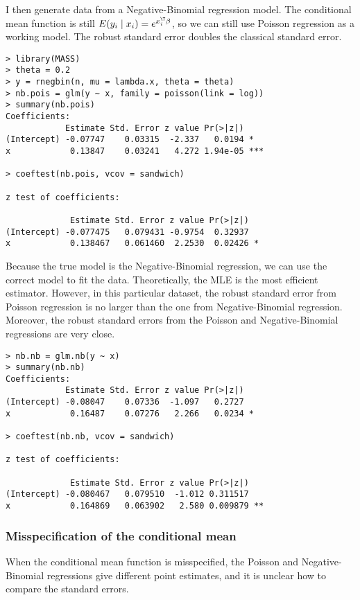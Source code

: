 I then generate data from a Negative-Binomial regression model. The conditional mean function is still $E(y_i\mid x_i) = e^{x_i^{\T} \beta}$, so we can still use Poisson regression as a working model. The robust standard error doubles the classical standard error. 

\begin{lstlisting}
> library(MASS)
> theta = 0.2
> y = rnegbin(n, mu = lambda.x, theta = theta)
> nb.pois = glm(y ~ x, family = poisson(link = log))
> summary(nb.pois)
Coefficients:
            Estimate Std. Error z value Pr(>|z|)    
(Intercept) -0.07747    0.03315  -2.337   0.0194 *  
x            0.13847    0.03241   4.272 1.94e-05 ***

> coeftest(nb.pois, vcov = sandwich)

z test of coefficients:

             Estimate Std. Error z value Pr(>|z|)  
(Intercept) -0.077475   0.079431 -0.9754  0.32937  
x            0.138467   0.061460  2.2530  0.02426 *
\end{lstlisting}


Because the true model is the Negative-Binomial regression, we can use the correct model to fit the data. Theoretically, the MLE is the most efficient estimator. However, in this particular dataset, the robust standard error from Poisson regression is no larger than the one from Negative-Binomial regression. Moreover, the robust standard errors from the Poisson and Negative-Binomial regressions are very close. 

\begin{lstlisting}
> nb.nb = glm.nb(y ~ x)
> summary(nb.nb)
Coefficients:
            Estimate Std. Error z value Pr(>|z|)  
(Intercept) -0.08047    0.07336  -1.097   0.2727  
x            0.16487    0.07276   2.266   0.0234 *

> coeftest(nb.nb, vcov = sandwich)

z test of coefficients:

             Estimate Std. Error z value Pr(>|z|)   
(Intercept) -0.080467   0.079510  -1.012 0.311517   
x            0.164869   0.063902   2.580 0.009879 **
\end{lstlisting}


 

\subsubsection{Misspecification of the conditional mean}


When the conditional mean function is misspecified, the Poisson and Negative-Binomial regressions give different point estimates, and it is unclear how to compare the standard errors. 

